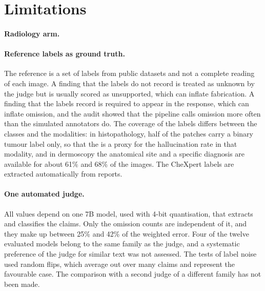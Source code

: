 \section{Limitations}\label{sec:limitations}

\paragraph{Radiology arm.} 

\paragraph{Reference labels as ground truth.} The reference is a set of labels from public datasets and not a complete reading of each image. A finding that the labels do not record is treated as unknown by the judge but is usually scored as unsupported, which can inflate fabrication. A finding that the labels record is required to appear in the response, which can inflate omission, and the audit showed that the pipeline calls omission more often than the simulated annotators do. The coverage of the labels differs between the classes and the modalities: in histopathology, half of the patches carry a binary tumour label only, so that the \SMHR{} is a proxy for the hallucination rate in that modality, and in dermoscopy the anatomical site and a specific diagnosis are available for about 61\% and 68\% of the images. The CheXpert labels are extracted automatically from reports.

\paragraph{One automated judge.} All values depend on one 7B model, used with 4-bit quantisation, that extracts and classifies the claims. Only the omission counts are independent of it, and they make up between 25\% and 42\% of the weighted error. Four of the twelve evaluated models belong to the same family as the judge, and a systematic preference of the judge for similar text was not assessed. The tests of label noise used random flips, which average out over many claims and represent the favourable case. The comparison with a second judge of a different family has not been made.

